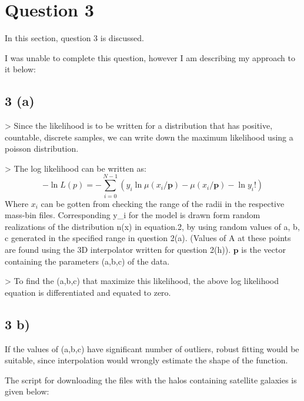 \section{Question 3}

In this section, question 3 is discussed.

I was unable to complete this question, however I am describing my approach to it below:

\subsection{3 (a)}
> Since the likelihood is to be written for a distribution that has positive, countable, discrete samples, we can write down the maximum likelihood using a poisson distribution.

> The log likelihood can be written as:
 $$ -\ln{L(p)} = -\sum\limits_{i=0}^{N-1} {(y_i \ln{\mu(x_i/\mathbf{p})} - \mu(x_i/\mathbf{p})- \ln{y_i!} )} $$
Where $x_i$ can be gotten from checking the range of the radii in the respective mass-bin files. Corresponding y_i for the model is drawn form random realizations of the distribution n(x) in equation.2, by using random values of a, b, c generated in the specified range in question 2(a). (Values of A at these points are found using the 3D interpolator written for question 2(h)). 
$\mathbf{p}$ is the vector containing the parameters (a,b,c) of the data.

> To find the (a,b,c) that maximize this likelihood, the above log likelihood equation is differentiated and equated to zero. 
 
 \subsection{3 b)}
If the values of (a,b,c) have significant number of outliers, robust fitting would be suitable, since interpolation would wrongly estimate the shape of the function. 
 
The script for downloading the files with the halos containing satellite galaxies is given below:


